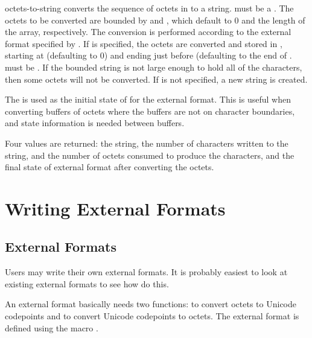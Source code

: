 \begin{defun}{}{octets-to-string}{\args {} }
   converts the sequence of octets in
   to a string.   must be a
  .  The octets to be
  converted are bounded by  and , which default to
  0 and the length of the array, respectively.  The conversion is
  performed according to the external format specified by
  .  If  is specified, the octets are
  converted and stored in , starting at 
  (defaulting to 0) and ending just before  (defaulting to
  the end of .   must be .
  If the bounded string is not large enough to hold all of the
  characters, then some octets will not be converted.  If 
  is not specified, a new string is created.

  The  is used as the initial state of for the external
  format.  This is useful when converting buffers of octets where the
  buffers are not on character boundaries, and state information is
  needed between buffers.

  Four values are returned: the string, the number of characters
  written to the string, and the number of octets consumed to produce
  the characters, and the final state of external format after
  converting the octets.
\end{defun}

\section{Writing External Formats}

\subsection{External Formats}
Users may write their own external formats.  It is probably easiest to
look at existing external formats to see how do this.

An external format basically needs two functions:
 to convert octets to Unicode codepoints and
 to convert Unicode codepoints to octets.  The
external format is defined using the macro
.

